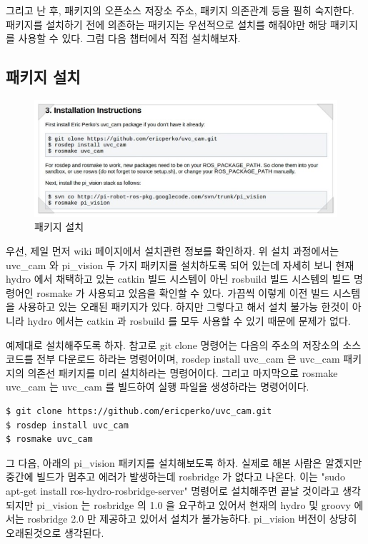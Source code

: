 그리고 난 후, 패키지의 오픈소스 저장소 주소, 패키지 의존관계 등을 필히 숙지한다. 패키지를 설치하기 전에 의존하는 패키지는 우선적으로 설치를 해줘야만 해당 패키지를 사용할 수 있다. 그럼 다음 챕터에서 직접 설치해보자.

\newpage
\subsection{패키지 설치}

\begin{figure}[h]
\centering\includegraphics[width=0.9\columnwidth]{pictures/chapter8/openpkg4.jpg}
\caption{패키지 설치}
\end{figure}

우선, 제일 먼저 wiki 페이지에서 설치관련 정보를 확인하자. 위 설치 과정에서는 uvc\_cam 와 pi\_vision 두 가지 패키지를 설치하도록 되어 있는데 자세히 보니 현재 hydro 에서 채택하고 있는 catkin 빌드 시스템이 아닌 rosbuild 빌드 시스템의 빌드 명령어인 rosmake 가 사용되고 있음을 확인할 수 있다. 가끔씩 이렇게 이전 빌드 시스템을 사용하고 있는 오래된 패키지가 있다. 하지만 그렇다고 해서 설치 불가능 한것이 아니라 hydro 에서는 catkin 과 rosbuild 를 모두 사용할 수 있기 때문에 문제가 없다.

예제대로 설치해주도록 하자. 참고로 git clone 명령어는 다음의 주소의 저장소의 소스코드를 전부 다운로드 하라는 명령어이며, rosdep install uvc\_cam 은 uvc\_cam 패키지의 의존선 패키지를 미리 설치하라는 명령어이다. 그리고 마지막으로 rosmake uvc\_cam 는 uvc\_cam 를 빌드하여 실행 파일을 생성하라는 명령어이다.

\vspace{\baselineskip}
\begin{lstlisting}[language=ROS]
$ git clone https://github.com/ericperko/uvc_cam.git
$ rosdep install uvc_cam
$ rosmake uvc_cam
\end{lstlisting}

그 다음, 아래의 pi\_vision 패키지를 설치해보도록 하자. 실제로 해본 사람은 알겠지만 중간에 빌드가 멈추고 에러가 발생하는데 rosbridge 가 없다고 나온다.  이는 "sudo apt-get install ros-hydro-rosbridge-server" 명령어로 설치해주면 끝날 것이라고 생각되지만 pi\_vision 는 rosbridge 의 1.0 을 요구하고 있어서 현재의 hydro 및 groovy 에서는 rosbridge 2.0 만 제공하고 있어서 설치가 불가능하다. pi\_vision 버전이 상당히 오래된것으로 생각된다.

